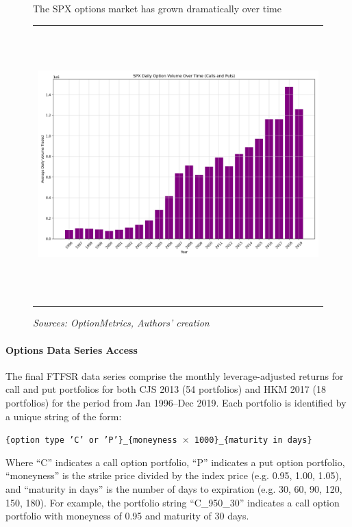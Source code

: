 \documentclass{article}
\begin{document}
\begin{appendices}
\begin{figure}[H]
  \centering
  \caption{The SPX options market has grown dramatically over time}
  \begin{tabular}{@{}c@{}}
    \includegraphics[height=300pt,width=400pt]{../docs_src/spx_options_over_time.png}
  \end{tabular}
  \caption*{\emph{Sources: OptionMetrics,  Authors' creation}}
  \label{fig:spx_options_over_time}
\end{figure}

\paragraph{Options Data Series Access}

The final FTFSR data series comprise the monthly leverage-adjusted returns for call and put portfolios for both CJS 2013 (54 portfolios) and HKM 2017 (18 portfolios) for the period from Jan 1996--Dec 2019. Each portfolio is identified by a unique string of the form: 

\begin{center}
{\texttt{\{option type 'C' or 'P'\}\_\{moneyness $\times$ 1000\}\_\{maturity in days\}}}
\end{center}

Where ``C'' indicates a call option portfolio, ``P'' indicates a put option portfolio, ``moneyness'' is the strike price divided by the index price (e.g. 0.95, 1.00, 1.05), and ``maturity in days'' is the number of days to expiration (e.g. 30, 60, 90, 120, 150, 180). For example, the portfolio string ``C\_950\_30'' indicates a call option portfolio with moneyness of 0.95 and maturity of 30 days.




\end{appendices}
\end{document}
